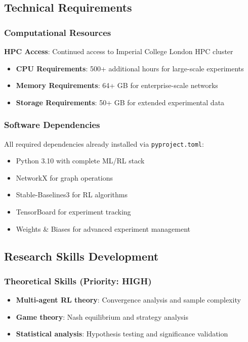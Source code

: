 \documentclass[11pt]{article}
\begin{document}
\subsection{Technical Requirements}

\subsubsection{Computational Resources}
\textbf{HPC Access}: Continued access to Imperial College London HPC cluster
\begin{itemize}
\item \textbf{CPU Requirements}: 500+ additional hours for large-scale experiments
\item \textbf{Memory Requirements}: 64+ GB for enterprise-scale networks
\item \textbf{Storage Requirements}: 50+ GB for extended experimental data
\end{itemize}

\subsubsection{Software Dependencies}
All required dependencies already installed via \texttt{pyproject.toml}:
\begin{itemize}
\item Python 3.10 with complete ML/RL stack
\item NetworkX for graph operations
\item Stable-Baselines3 for RL algorithms
\item TensorBoard for experiment tracking
\item Weights \& Biases for advanced experiment management
\end{itemize}

\subsection{Research Skills Development}

\subsubsection{Theoretical Skills (Priority: HIGH)}
\begin{itemize}
\item \textbf{Multi-agent RL theory}: Convergence analysis and sample complexity
\item \textbf{Game theory}: Nash equilibrium and strategy analysis
\item \textbf{Statistical analysis}: Hypothesis testing and significance validation
\end{itemize}
\end{document}
